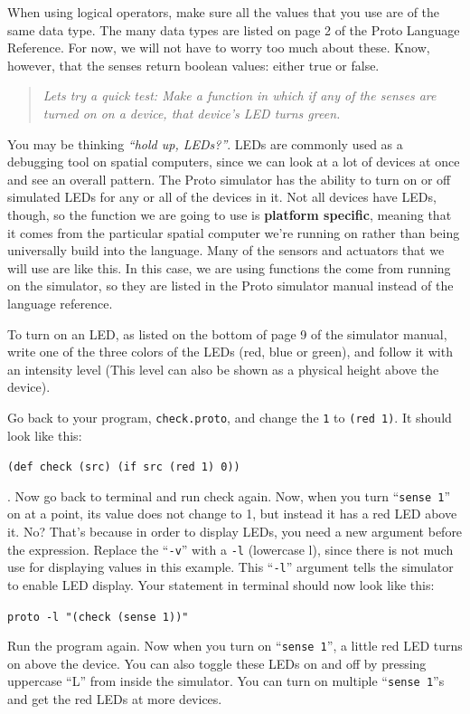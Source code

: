 \documentclass{article}
\newcommand\code[1]{\begin{center}\var{#1}\end{center}}
\newcommand\problem[1]{\begin{quote}{\em #1}\end{quote}}
\newcommand\var[1]{{\tt #1}}
\newcommand\qvar[1]{``{\tt #1}''}
\begin{document}
When using logical operators, make sure all the values that you use
are of the same data type.  The many data types are listed on page 2
of the Proto Language Reference.  For now, we will not have to worry
too much about these.  Know, however, that the senses return boolean
values: either true or false.

\problem{Lets try a quick test: Make a function in which if any of the senses
are turned on on a device, that device's LED turns green.}

You may be thinking {\em ``hold up, LEDs?''}.  LEDs are commonly used
as a debugging tool on spatial computers, since we can look at a lot
of devices at once and see an overall pattern.  The Proto simulator
has the ability to turn on or off simulated LEDs for any or all of the
devices in it.  Not all devices have LEDs, though, so the function we
are going to use is {\bf platform specific}, meaning that it comes
from the particular spatial computer we're running on rather than
being universally build into the language.  Many of the sensors and
actuators that we will use are like this.  In this case, we are using
functions the come from running on the simulator, so they are listed
in the Proto simulator manual instead of the language reference.

To turn on an LED, as listed on the bottom of page 9 of the simulator
manual, write one of the three colors of the LEDs (red, blue or
green), and follow it with an intensity level (This level can also be
shown as a physical height above the device).

Go back to your program, \var{check.proto}, and change the \var{1} to
\var{(red 1)}.  It should look like this: \code{(def check (src) (if
  src (red 1) 0))}.  Now go back to terminal and run check again.
Now, when you turn \qvar{sense 1} on at a point, its value does not
change to 1, but instead it has a red LED above it.  No?  That's
because in order to display LEDs, you need a new argument before the
expression.  Replace the \qvar{-v} with a \var{-l} (lowercase l),
since there is not much use for displaying values in this example.
This \qvar{-l} argument tells the simulator to enable LED
display. Your statement in terminal should now look like this:

\code{proto -l "(check (sense 1))"}

Run the program again. Now when you turn on \qvar{sense 1}, a little
red LED turns on above the device.  You can also toggle these LEDs on
and off by pressing uppercase ``L'' from inside the simulator.  You
can turn on multiple \qvar{sense 1}s and get the red LEDs at more
devices.
\end{document}
